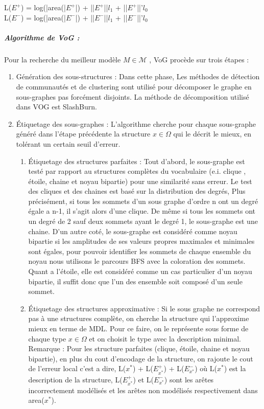 \begin{center}
L(${E}^{+}$) = log(|area(|${E}^{+}$|) + ||${E}^{+}$||\textit{$l_{1}$} + ||${E}^{+}$||'\textit{$l_{0}$}\\
L(${E}^{-}$) = log(|area(|${E}^{-}$|) + ||${E}^{-}$||\textit{$l_{1}$} + ||${E}^{-}$||'\textit{$l_{0}$}\\
\end{center} 
 


\subparagraph{Algorithme de VoG :}
Pour la recherche du meilleur modèle $ \textit{M} \in \mathcal{M} $ , VoG procède sur trois étapes :
\begin{enumerate}
 \item Génération des sous-structures : Dans cette phase, Les méthodes de détection de communautés et de clustering sont utilisé pour décomposer le graphe en sous-graphes pas forcément disjoints. La méthode de décomposition utilisé dans VOG est SlashBurn.  
 \item Étiquetage des sous-graphes : L'algorithme cherche pour chaque sous-graphe généré dans l'étape précédente la structure $x \in \Omega$ qui le décrit le mieux, en tolérant un certain seuil d'erreur.
  \begin{enumerate}[label=\alph*]
     \item Étiquetage des structures parfaites : Tout d'abord, le sous-graphe est testé par rapport au structures complètes du vocabulaire (e.i. clique , étoile, chaine et noyau bipartie) pour une similarité sans erreur. Le test des cliques et des chaines est basé sur la distribution des degrés, Plus précisément, si tous les sommets d'un sous graphe d'ordre n ont un degré égale a n-1, il s'agit alors d'une clique. De même si tous les sommets ont un degré de 2 sauf deux sommets ayant le degré 1, le  sous-graphe est une chaine. D'un autre coté, le sous-graphe est considéré comme noyau bipartie si les amplitudes de ses valeurs propres maximales et minimales sont égales, pour pouvoir identifier les sommets de chaque ensemble du noyau nous utilisons le parcours BFS avec la coloration des sommets. Quant a l'étoile, elle est considéré comme un cas particulier d'un noyau bipartie, il suffit donc que l'un des ensemble soit composé d'un seule sommet.
     
     \item Étiquetage des structures approximative : Si le sous graphe ne correspond pas à une structures complète, on cherche la structure qui l'approxime mieux en terme de MDL. Pour ce faire, on le représente sous forme de chaque type $x \in \Omega$ et on choisit le type avec la description minimal.\\
     Remarque : Pour les structure parfaites (clique, étoile, chaine et noyau bipartie), en plus du cout d'encodage de la structure, on rajoute le cout de l'erreur local c'est a dire, L($x^{*}$) + L($\textit{E}^{+}_{x^{*}}$) + L($\textit{E}^{-}_{x^{*}}$) où L($x^{*}$) est la description de la structure, L($\textit{E}^{+}_{x^{*}}$) et L($\textit{E}^{-}_{x^{*}}$) sont les arêtes incorrectement modélisés et les arêtes non  modélisés respectivement dans area($x^{*}$).
  \end{enumerate} 


\end{enumerate}
